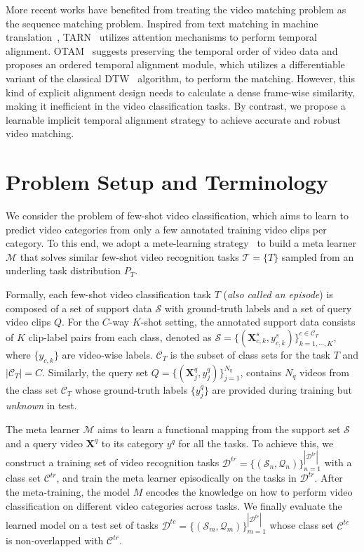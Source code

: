 \documentclass{article}
\begin{document}
More recent works have benefited from treating the video matching problem as the sequence matching problem. Inspired from text matching in machine translation~\cite{bahdanau2014neural,wang2016compare}, TARN~\cite{bishay2019tarn} utilizes attention mechanisms to perform temporal alignment. OTAM~\cite{cao2020few} suggests preserving the temporal order of video data and proposes an ordered temporal alignment module, which utilizes a differentiable variant of the classical DTW~\cite{muller2007dynamic} algorithm, to perform the matching. However, this kind of explicit alignment design needs to calculate a dense frame-wise similarity, making it inefficient in the video classification tasks.
By contrast, we propose a learnable implicit temporal alignment strategy to achieve accurate and robust video matching.





 \section{Problem Setup and Terminology}\label{sec:setting}
We consider the problem of few-shot video classification, which aims to learn to predict video categories from only a few annotated training video clips per category. To this end, we adopt a mete-learning strategy~\cite{vinyals2016matching} to build a meta learner $\mathcal{M}$ that solves similar few-shot video recognition tasks $\mathcal{T}=\{T\}$ sampled from an underling task distribution $P_T$. 

Formally, each few-shot video classification task $T$ (\textit{also called an episode}) is composed of a set of support data $\mathcal{S}$ with ground-truth labels and a set of query video clips $Q$. For the $C$-way $K$-shot setting, the annotated support data consists of $K$ clip-label pairs from each class, denoted as $\mathcal{S}=\{(\mathbf{X}^s_{c,k}, y^s_{c,k})\}_{k=1,\cdots,K}^{c\in \mathcal{C}_T}$, where $\{y_{c,k}\}$ are video-wise labels. $\mathcal{C}_T$ is the subset of class sets for the task $T$ and $|\mathcal{C}_T|=C$. Similarly, the query set $Q=\{(\mathbf{X}_{j}^q,y_j^q)\}_{j=1}^{N_q}$, contains $N_q$ videos from the class set $\mathcal{C}_T$ whose ground-truth labels $\{y_j^q\}$ are provided during training but \textit{unknown} in test.

The meta learner $\mathcal{M}$ aims to learn a functional mapping from the support set $\mathcal{S}$ and a query video $\mathbf{X}^q$ to its category $y^q$ for all the tasks. To achieve this, we construct a training set of video recognition tasks $\mathcal{D}^{tr}=\{(\mathcal{S}_n,\mathcal{Q}_n)\}_{n=1}^{|\mathcal{D}^{tr}|}$ with a class set $\mathcal{C}^{tr}$, and train the meta learner episodically on the tasks in $\mathcal{D}^{tr}$. After the meta-training, the model $M$ encodes the knowledge on how to perform video classification on different video categories across tasks. We finally evaluate the learned model on a test set of tasks $\mathcal{D}^{te}=\{(\mathcal{S}_m, \mathcal{Q}_m)\}_{m=1}^{|\mathcal{D}^{te}|}$ whose class set $\mathcal{C}^{te}$ is non-overlapped with $\mathcal{C}^{tr}$.
\end{document}
